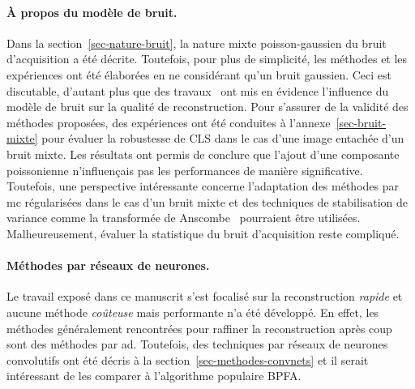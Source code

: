 \paragraph{\`A propos du modèle de bruit.} Dans la section~\ref{sec-nature-bruit}, la nature mixte poisson-gaussien du bruit d'acquisition a été décrite. Toutefois, pour plus de simplicité, les méthodes et les expériences ont été élaborées en ne considérant qu'un bruit gaussien. Ceci est discutable, d'autant plus que des travaux~\cite{sanders2018inpainting} ont mis en évidence l'influence du modèle de bruit sur la qualité de reconstruction. Pour s'assurer de la validité des méthodes proposées, des expériences ont été conduites à l'annexe~\ref{sec-bruit-mixte} pour évaluer la robustesse de CLS dans le cas d'une image entachée d'un bruit mixte. Les résultats ont permis de conclure que l'ajout d'une composante poissonienne n'influençais pas les performances de manière significative. Toutefois, une perspective intéressante concerne l'adaptation des méthodes par \gls{mc} régularisées dans le cas d'un bruit mixte et des techniques de stabilisation de variance comme la transformée de Anscombe~\cite{anscombe1948transformation} pourraient être utilisées. Malheureusement, évaluer la statistique du bruit d'acquisition reste compliqué.


\paragraph{Méthodes par réseaux de neurones.} Le travail exposé dans ce manuscrit s'est focalisé sur la reconstruction \emph{rapide} et aucune méthode \emph{coûteuse} mais performante n'a été développé. En effet, les méthodes généralement rencontrées pour raffiner la reconstruction après coup sont des méthodes par \gls{ad}. Toutefois, des techniques par réseaux de neurones convolutifs ont été décris à la section~\ref{sec-methodes-convnets} et il serait intéressant de les comparer à l'algorithme populaire BPFA.







